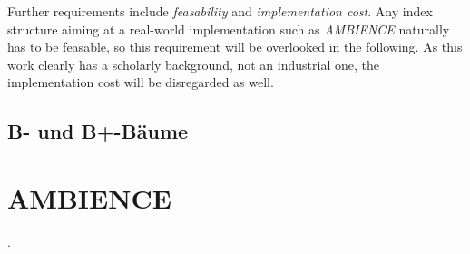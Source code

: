 Further requirements include \textit{feasability} and \textit{implementation cost}. Any index structure aiming at a real-world implementation such as \textit{AMBIENCE} naturally has to be feasable, so this requirement will be overlooked in the following. As this work clearly has a scholarly background, not an industrial one, the implementation cost will be disregarded as well.\\ 
\cite{Ottmann2012}
\subsection{B- und B+-Bäume}	
\cite{Knuth1998}	
\section{AMBIENCE}\label{sec:ambience}
\cite{Werner2015}. 